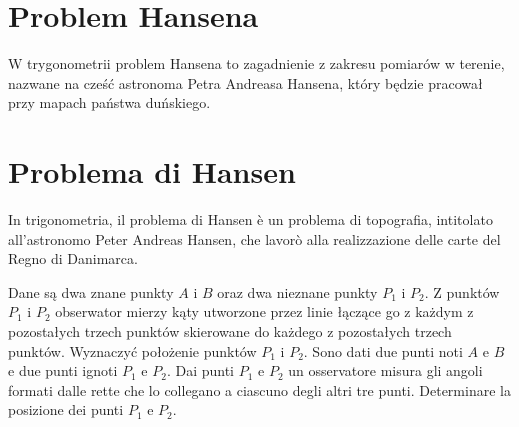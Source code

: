 
%

\section{Problem Hansena} %
W trygonometrii problem Hansena to zagadnienie z zakresu pomiarów w terenie, nazwane na cześć astronoma Petra Andreasa Hansena, który będzie pracował przy mapach państwa duńskiego. %
\section{Problema di Hansen} %
In trigonometria, il problema di Hansen è un problema di topografia, intitolato all'astronomo Peter Andreas Hansen, che lavorò alla realizzazione delle carte del Regno di Danimarca. %

\begin{problem}
    Dane są dwa znane punkty $A$ i $B$ oraz dwa nieznane punkty $P_1$ i $P_2$. %
    Z punktów $P_1$ i $P_2$ obserwator mierzy kąty utworzone przez linie łączące go z każdym z pozostałych trzech punktów skierowane do każdego z pozostałych trzech punktów. %
    Wyznaczyć położenie punktów $P_1$ i $P_2$. %
    Sono dati due punti noti $A$ e $B$ e due punti ignoti $P_1$ e $P_2$. %
    Dai punti $P_1$ e $P_2$ un osservatore misura gli angoli formati dalle rette che lo collegano a ciascuno degli altri tre punti. %
    Determinare la posizione dei punti $P_1$ e $P_2$. %
\end{problem}

